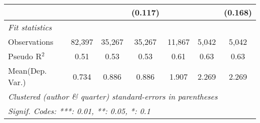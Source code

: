 \begin{tabular}{lcccccc}
                           &              &         & (0.117)       &         &         & (0.168)\\   
   \midrule
   \emph{Fit statistics}\\
   Observations            & 82,397       & 35,267  & 35,267        & 11,867  & 5,042   & 5,042\\  
   Pseudo R$^2$            & 0.51         & 0.53    & 0.53          & 0.61    & 0.63    & 0.63\\  
Mean(Dep. Var.) & 0.734 & 0.886 & 0.886 & 1.907 & 2.269 & 2.269 \\
   \midrule \midrule
   \multicolumn{7}{l}{\emph{Clustered (author \& quarter) standard-errors in parentheses}}\\
   \multicolumn{7}{l}{\emph{Signif. Codes: ***: 0.01, **: 0.05, *: 0.1}}\\
\end{tabular}
\par\endgroup
